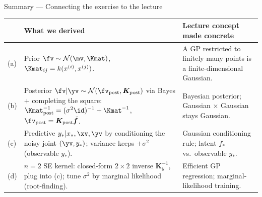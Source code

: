 \documentclass[aspectratio=169]{beamer}
\renewcommand{\N}{\mathcal{N}}
\newcommand{\ssqiinv}{(\sigma^2 \id)^{-1}}
\newcommand{\kinv}{\Kmat^{-1}}
\newcommand{\kpinv}{\Kmat_{\text{post}}^{-1}}
\newcommand{\tfv}{\tilde{\bm{f}}}
\newcommand{\Kpost}{\bm{K}_{\text{post}}}
\newcommand{\fpost}{\fv_{\text{post}}}
\newcommand{\ys}{y_{*}}
\newcommand{\xs}{x_{*}}
\newcommand{\Kmaty}{\bm{K}_y}
\begin{document}
\begin{frame}{Summary --- Connecting the exercise to the lecture}
	\footnotesize
	\begin{center}
	\renewcommand{\arraystretch}{1.15}
	\begin{tabular}{@{}>{\raggedright\arraybackslash}p{}>{\raggedright\arraybackslash}p{}>{\raggedright\arraybackslash}p{}@{}}
		\toprule
		& \textbf{What we derived} & \textbf{Lecture concept made concrete} \\
		\midrule
		(a) &
			Prior $\fv\sim\N(\mv,\Kmat)$, $\Kmat_{ij}=k(x^{(i)},x^{(j)})$. &
			A GP restricted to finitely many points is a finite-dimensional Gaussian. \\
		(b) &
			Posterior $\fv|\yv\sim\N(\fpost,\Kpost)$ via Bayes $+$ completing the square: $\kpinv=\ssqiinv+\kinv$, $\fpost=\Kpost\tfv$. &
			Bayesian posterior; Gaussian $\times$ Gaussian stays Gaussian. \\
		(c) &
			Predictive $\ys|\xs,\xv,\yv$ by conditioning the noisy joint $(\yv,\ys)$; variance keeps $+\sigma^2$ (observable $\ys$). &
			Gaussian conditioning rule; latent $f_*$ vs.\ observable $\ys$. \\
		(d) &
			$n=2$ SE kernel: closed-form $2\times2$ inverse $\Kmaty^{-1}$, plug into (c); tune $\sigma^2$ by marginal likelihood (root-finding). &
			Efficient GP regression; marginal-likelihood training. \\
		\bottomrule
	\end{tabular}
	\end{center}
\end{frame}
\end{document}
